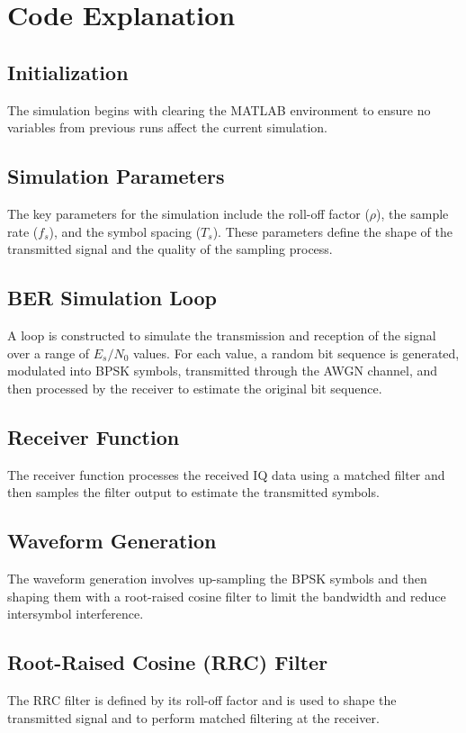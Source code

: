 \documentclass{article}
\begin{document}
\section{Code Explanation}
\subsection{Initialization}
The simulation begins with clearing the MATLAB environment to ensure no variables from previous runs affect the current simulation.

\subsection{Simulation Parameters}
The key parameters for the simulation include the roll-off factor (\( \rho \)), the sample rate (\( f_s \)), and the symbol spacing (\( T_s \)). These parameters define the shape of the transmitted signal and the quality of the sampling process.

\subsection{BER Simulation Loop}
A loop is constructed to simulate the transmission and reception of the signal over a range of \( E_s/N_0 \) values. For each value, a random bit sequence is generated, modulated into BPSK symbols, transmitted through the AWGN channel, and then processed by the receiver to estimate the original bit sequence.

\subsection{Receiver Function}
The receiver function processes the received IQ data using a matched filter and then samples the filter output to estimate the transmitted symbols.

\subsection{Waveform Generation}
The waveform generation involves up-sampling the BPSK symbols and then shaping them with a root-raised cosine filter to limit the bandwidth and reduce intersymbol interference.

\subsection{Root-Raised Cosine (RRC) Filter}
The RRC filter is defined by its roll-off factor and is used to shape the transmitted signal and to perform matched filtering at the receiver.
\end{document}
